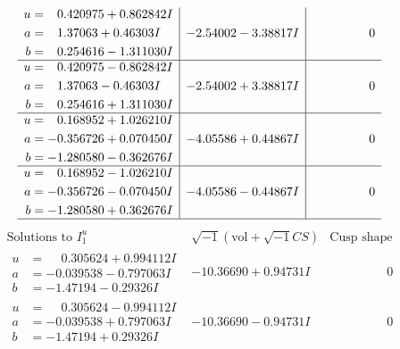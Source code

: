 \documentclass[1p]{elsarticle_modified}
\theoremstyle{definition}
\newcommand{\I}{\sqrt{-1}}
\begin{document}
$$\begin{array}{c|c|c}
\begin{aligned}
u &= \phantom{-}0.420975 + 0.862842 I \\
a &= \phantom{-}1.37063 + 0.46303 I \\
b &= \phantom{-}0.254616 - 1.311030 I\end{aligned}
 & -2.54002 - 3.38817 I & \phantom{-0.000000 } 0 \\ \hline\begin{aligned}
u &= \phantom{-}0.420975 - 0.862842 I \\
a &= \phantom{-}1.37063 - 0.46303 I \\
b &= \phantom{-}0.254616 + 1.311030 I\end{aligned}
 & -2.54002 + 3.38817 I & \phantom{-0.000000 } 0 \\ \hline\begin{aligned}
u &= \phantom{-}0.168952 + 1.026210 I \\
a &= -0.356726 + 0.070450 I \\
b &= -1.280580 - 0.362676 I\end{aligned}
 & -4.05586 + 0.44867 I & \phantom{-0.000000 } 0 \\ \hline\begin{aligned}
u &= \phantom{-}0.168952 - 1.026210 I \\
a &= -0.356726 - 0.070450 I \\
b &= -1.280580 + 0.362676 I\end{aligned}
 & -4.05586 - 0.44867 I & \phantom{-0.000000 } 0\\
 \hline 
 \end{array}$$\newpage$$\begin{array}{c|c|c}  
\text{Solutions to }I^u_{1}& \I (\text{vol} + \sqrt{-1}CS) & \text{Cusp shape}\\
 \hline 
\begin{aligned}
u &= \phantom{-}0.305624 + 0.994112 I \\
a &= -0.039538 - 0.797063 I \\
b &= -1.47194 - 0.29326 I\end{aligned}
 & -10.36690 + 0.94731 I & \phantom{-0.000000 } 0 \\ \hline\begin{aligned}
u &= \phantom{-}0.305624 - 0.994112 I \\
a &= -0.039538 + 0.797063 I \\
b &= -1.47194 + 0.29326 I\end{aligned}
 & -10.36690 - 0.94731 I & \phantom{-0.000000 } 0 \\ \hline\begin{aligned}

\end{aligned}
\end{array}$$
\end{document}
